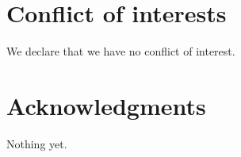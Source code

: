 \documentclass[a4paper,8pt,twocolumn,5p]{elsarticle}
\begin{document}
\section*{Conflict of interests}
We declare that we have no conflict of interest.

\section*{Acknowledgments}
Nothing yet.



\end{document}
